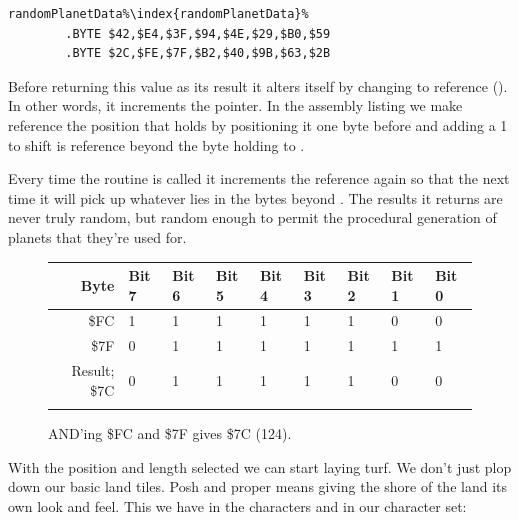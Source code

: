 \begin{definition}
\begin{lstlisting}[caption=Not Quite Random Bytes,escapechar=\%]
randomPlanetData%\index{randomPlanetData}%
        .BYTE $42,$E4,$3F,$94,$4E,$29,$B0,$59
        .BYTE $2C,$FE,$7F,$B2,$40,$9B,$63,$2B
\end{lstlisting}
Before returning this value as its result it alters itself by changing
 to reference  (). In other words, it increments the pointer. In the
assembly listing we make  reference the position
that holds  by positioning it one byte before and
adding a 1 to shift is reference beyond the byte holding  to
.

Every time the routine is called it increments the reference again so that the next time it will pick up whatever
lies in the bytes beyond . The results it returns are never truly random, but random enough
to permit the procedural generation of planets that they're used for.
\end{definition}
\begin{figure}[H]
  {
    \setlength{\tabcolsep}{3.0pt}
    \setlength\cmidrulewidth{\heavyrulewidth} %
    \begin{adjustbox}{width=10cm,center}

      \begin{tabular}{rllllllll}
        \toprule
        Byte & Bit 7 & Bit 6 & Bit 5 & Bit 4 & Bit 3 & Bit 2 & Bit 1 & Bit 0        \\
        \midrule
        \$FC & 1 & 1 & 1 & 1 & 1 & 1 & 0 & 0 \\
        \$7F & 0 & 1 & 1 & 1 & 1 & 1 & 1 & 1 \\
        \midrule
        Result; \$7C & 0 & 1 & 1 & 1 & 1 & 1 & 0 & 0 \\
        \addlinespace
        \bottomrule
      \end{tabular}

    \end{adjustbox}

  }\caption*{AND'ing \$FC and \$7F gives \$7C (124).}
\end{figure}

With the position and length selected we can start laying turf. We don't just plop down our basic land tiles. Posh
and proper means giving the shore of the land its own look and feel. This we have in the characters  and
 in our character set: 


